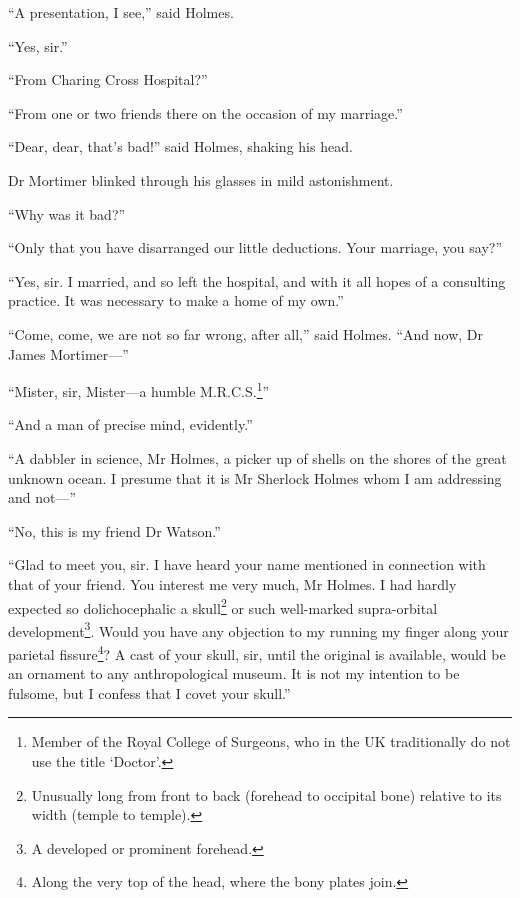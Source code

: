 \documentclass[paper=5.5in:8.5in,BCOR=7mm,twoside,DIV=calc,12pt,usegeometry,openany,chapterprefix,endperiod]{scrbook} %
\begin{document}
\enquote{A presentation, I see,} said Holmes.

\enquote{Yes, sir.}

\enquote{From Charing Cross Hospital?}

\enquote{From one or two friends there on the occasion of my marriage.}

\enquote{Dear, dear, that's bad!} said Holmes, shaking his head.

Dr Mortimer blinked through his glasses in mild astonishment.

\enquote{Why was it bad?}

\enquote{Only that you have disarranged our little deductions. Your marriage, you say?}


\enquote{Yes, sir. I married, and so left the hospital, and with it all hopes of a consulting practice. It was necessary to make a home of my own.}

\enquote{Come, come, we are not so far wrong, after all,} said Holmes. \enquote{And now, Dr James Mortimer\nobreakdash---}

\enquote{Mister, sir, Mister\nobreakdash---a humble M.R.C.S.\footnote{Member of the Royal College of Surgeons, who in the UK traditionally do not use the title \enquote{Doctor}.}}

\enquote{And a man of precise mind, evidently.}

\enquote{A dabbler in science, Mr Holmes, a picker up of shells on the shores of the great unknown ocean. I presume that it is Mr Sherlock Holmes whom I am addressing and not\nobreakdash---}

\enquote{No, this is my friend Dr Watson.}

\enquote{Glad to meet you, sir. I have heard your name mentioned in connection with that of your friend. You interest me very much, Mr Holmes. I had hardly expected so dolichocephalic a skull\footnote{Unusually long from front to back (forehead to occipital bone) relative to its width (temple to temple).} or such well-marked supra-orbital development\footnote{A developed or prominent forehead.}. Would you have any objection to my running my finger along your parietal fissure\footnote{Along the very top of the head, where the bony plates join.}? A cast of your skull, sir, until the original is available, would be an ornament to any anthropological museum. It is not my intention to be fulsome, but I confess that I covet your skull.}
\end{document}
